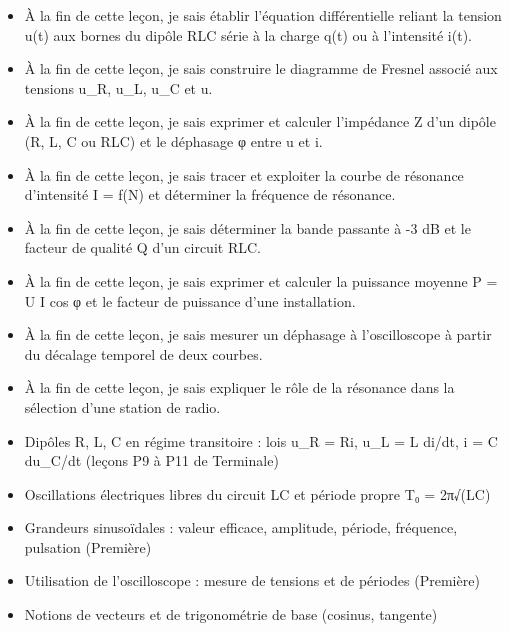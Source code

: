 \documentclass[11pt]{article}
\begin{document}
\begin{objectifs}
\begin{itemize}
\item À la fin de cette leçon, je sais établir l'équation différentielle reliant la tension u(t) aux bornes du dipôle RLC série à la charge q(t) ou à l'intensité i(t).
\item À la fin de cette leçon, je sais construire le diagramme de Fresnel associé aux tensions u\_R, u\_L, u\_C et u.
\item À la fin de cette leçon, je sais exprimer et calculer l'impédance Z d'un dipôle (R, L, C ou RLC) et le déphasage φ entre u et i.
\item À la fin de cette leçon, je sais tracer et exploiter la courbe de résonance d'intensité I = f(N) et déterminer la fréquence de résonance.
\item À la fin de cette leçon, je sais déterminer la bande passante à -3 dB et le facteur de qualité Q d'un circuit RLC.
\item À la fin de cette leçon, je sais exprimer et calculer la puissance moyenne P = U I cos φ et le facteur de puissance d'une installation.
\item À la fin de cette leçon, je sais mesurer un déphasage à l'oscilloscope à partir du décalage temporel de deux courbes.
\item À la fin de cette leçon, je sais expliquer le rôle de la résonance dans la sélection d'une station de radio.
\end{itemize}
\end{objectifs}

\begin{prerequis}
\begin{itemize}
\item Dipôles R, L, C en régime transitoire : lois u\_R = Ri, u\_L = L di/dt, i = C du\_C/dt (leçons P9 à P11 de Terminale)
\item Oscillations électriques libres du circuit LC et période propre T₀ = 2π√(LC)
\item Grandeurs sinusoïdales : valeur efficace, amplitude, période, fréquence, pulsation (Première)
\item Utilisation de l'oscilloscope : mesure de tensions et de périodes (Première)
\item Notions de vecteurs et de trigonométrie de base (cosinus, tangente)
\end{itemize}
\end{prerequis}

\newpage
\end{document}
